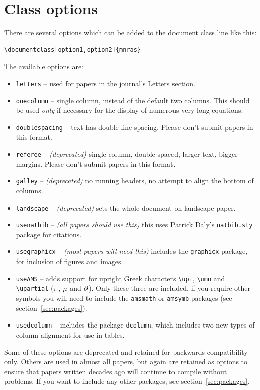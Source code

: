 \documentclass[a4paper,fleqn,usenatbib,useAMS]{mnras}
\begin{document}
\section{Class options}
\label{sec:options}
There are several options which can be added to the document class line like this:

\begin{verbatim}
\documentclass[option1,option2]{mnras}
\end{verbatim}
The available options are:
\begin{itemize}
\item \verb'letters' -- used for papers in the journal's Letters section.
\item \verb'onecolumn' -- single column, instead of the default two columns. This should be used {\it only} if necessary for the display of numerous very long equations.
\item \verb'doublespacing' -- text has double line spacing. Please don't submit papers in this format.
\item \verb'referee' -- \textit{(deprecated)} single column, double spaced, larger text, bigger margins. Please don't submit papers in this format.
\item \verb'galley' -- \textit{(deprecated)} no running headers, no attempt to align the bottom of columns.
\item \verb'landscape' -- \textit{(deprecated)} sets the whole document on landscape paper.
\item \verb"usenatbib" -- \textit{(all papers should use this)} this uses Patrick Daly's \verb"natbib.sty" package for citations.
\item \verb"usegraphicx" -- \textit{(most papers will need this)} includes the \verb'graphicx' package, for inclusion of figures and images.
\item \verb'useAMS' -- adds support for upright Greek characters \verb'\upi', \verb'\umu' and \verb'\upartial' ($\pi$, $\mu$ and $\partial$). Only these three are included, if you require other symbols you will need to include the \verb'amsmath' or \verb'amsymb' packages (see section~\ref{sec:packages}).
\item \verb"usedcolumn" -- includes the package \verb"dcolumn", which includes two new types of column alignment for use in tables.
\end{itemize}

Some of these options are deprecated and retained for backwards compatibility only.
Others are used in almost all papers, but again are retained as options to ensure that papers written decades ago will continue to compile without problems.
If you want to include any other packages, see section~\ref{sec:packages}.
\end{document}
